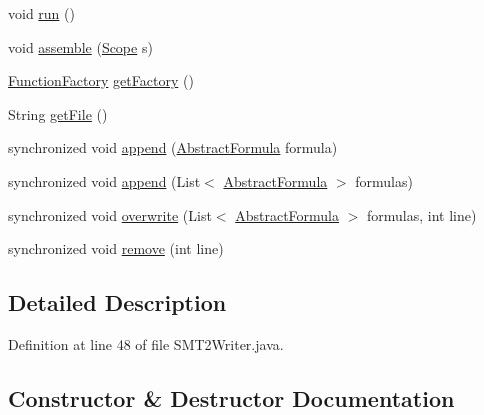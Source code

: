 \begin{DoxyCompactItemize}
void \hyperlink{classuran_1_1formula_1_1smt2_1_1_s_m_t2_writer_a236d3b3d70abec49cdcca3a3d89aa827}{run} ()
\item 
void \hyperlink{classuran_1_1formula_1_1smt2_1_1_s_m_t2_writer_a366346a38fca1dd4a47c2b1c2a110a41}{assemble} (\hyperlink{classuran_1_1formula_1_1_scope}{Scope} s)
\item 
\hyperlink{classuran_1_1formula_1_1_function_factory}{Function\+Factory} \hyperlink{classuran_1_1formula_1_1smt2_1_1_s_m_t2_writer_a755563b7ee2f71b59e314e6f3e15202d}{get\+Factory} ()
\item 
String \hyperlink{classuran_1_1formula_1_1smt2_1_1_s_m_t2_writer_a032269a0cbac309908d2d4e79a9f0086}{get\+File} ()
\item 
synchronized void \hyperlink{classuran_1_1formula_1_1smt2_1_1_s_m_t2_writer_a9bb530a6c363948a59e5785cb88b5bbc}{append} (\hyperlink{classuran_1_1formula_1_1_abstract_formula}{Abstract\+Formula} formula)
\item 
synchronized void \hyperlink{classuran_1_1formula_1_1smt2_1_1_s_m_t2_writer_a7bd52a8c8bd8869a47393b7cdc492967}{append} (List$<$ \hyperlink{classuran_1_1formula_1_1_abstract_formula}{Abstract\+Formula} $>$ formulas)
\item 
synchronized void \hyperlink{classuran_1_1formula_1_1smt2_1_1_s_m_t2_writer_a2d2e167b7f6e94e750dc6d8615f3fae8}{overwrite} (List$<$ \hyperlink{classuran_1_1formula_1_1_abstract_formula}{Abstract\+Formula} $>$ formulas, int line)
\item 
synchronized void \hyperlink{classuran_1_1formula_1_1smt2_1_1_s_m_t2_writer_ab769b1e42b1f98422ad65e4b9fe0f7d7}{remove} (int line)
\end{DoxyCompactItemize}


\subsection{Detailed Description}


Definition at line 48 of file S\+M\+T2\+Writer.\+java.



\subsection{Constructor \& Destructor Documentation}
\hypertarget{classuran_1_1formula_1_1smt2_1_1_s_m_t2_writer_a88904339a24bd533f5584860c77dcd2c}{}
